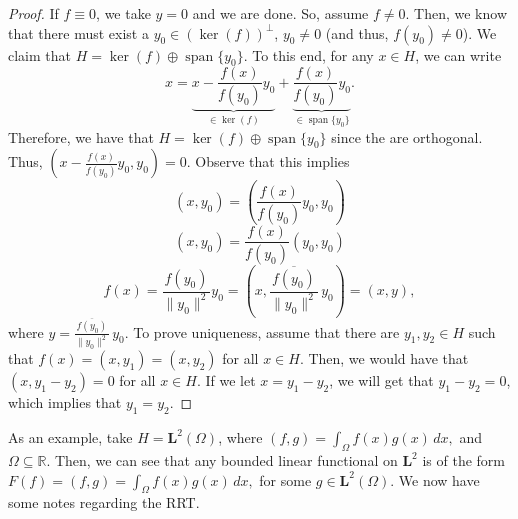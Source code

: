 \documentclass[12pt]{article}
\newcommand{\R}{{\mathbb R}}
\newcommand{\Om}{\Omega}
\newcommand{\ov}{\overline}
\newcommand{\ml}{\mathbf{L}}
\newcommand{\sse}{\subseteq}
\DeclareMathOperator*{\spa}{span}
\begin{document}
\vspace{-25pt}
\begin{proof}
If $f \equiv 0$, we take $y = 0$ and we are done. So, assume $f \neq 0$. Then, we know that there must exist a $y_0 \in (\ker(f))^{\perp}$, $y_0 \neq 0$ (and thus, $f(y_0) \neq 0$). We claim that $H = \ker(f) \oplus \spa\{ y_0 \}$. To this end, for any $x \in H$, we can write 
\[ x = \underbrace{x - \frac{f(x)}{f(y_0)} y_0}_{\in \ker(f)} + \underbrace{\frac{f(x)}{f(y_0)} y_0}_{\in \spa\{ y_0 \}}. \]
Therefore, we have that $H = \ker(f) \oplus \spa\{ y_0 \}$ since the are orthogonal. Thus, $\left( x - \frac{f(x)}{f(y_0)} y_0, y_0 \right) = 0$. Observe that this implies 
\[ (x, y_0) = \left(\frac{f(x)}{f(y_0)} y_0, y_0 \right)\]
\[ (x, y_0) = \frac{f(x)}{f(y_0)}  (y_0, y_0)\]
\[ f(x) = \frac{f(y_0)}{\| y_0 \|^2} y_0 = \left( x , \frac{\ov{f(y_0)}}{\| y_0\|^2} \, y_0 \right) = (x, y),\]
where $y = \frac{\ov{f(y_0)}}{\| y_0\|^2}\,  y_0$. To prove uniqueness, assume that there are $y_1, y_2 \in H$ such that $f(x) = (x, y_1) = (x, y_2)$ for all $x \in H$. Then, we would have that $(x, y_1 - y_2) = 0$ for all $x \in H$. If we let $x = y_1 - y_2$, we will get that $y_1 - y_2 = 0$, which implies that $y_1 = y_2$. 
\end{proof}
\vspace{-15pt}
As an example, take $H = \ml^2(\Om)$, where $(f, g) = \int_{\Om} f(x) g(x) \, dx,$ and $\Om \sse \R$. Then, we can see that any bounded linear functional on $\ml^2$ is of the form $F(f) = (f, g) = \int_{\Om} f(x) g(x) \, dx,$ for some $g \in \ml^2(\Om)$. We now have some notes regarding the RRT. 
\end{document}
